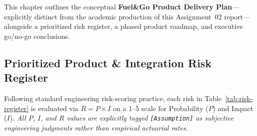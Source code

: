 
This chapter outlines the conceptual \textbf{Fuel\&Go Product Delivery Plan}—explicitly distinct from the academic production of this Assignment~02 report—alongside a prioritized risk register, a phased product roadmap, and executive go/no-go conclusions.

\subsection{Prioritized Product \& Integration Risk Register}
Following standard engineering risk-scoring practice, each risk in Table~\ref{tab:risk-register} is evaluated via $R = P \times I$ on a 1--5 scale for Probability ($P$) and Impact ($I$). \emph{All $P$, $I$, and $R$ values are explicitly tagged \texttt{[Assumption]} as subjective engineering judgments rather than empirical actuarial rates.}

